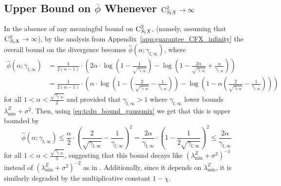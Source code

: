 \documentclass[11pt]{article}
\theoremstyle{definition}
\theoremstyle{plain}
\providecommand{\appendixref}[1]{Appendix~\ref{#1}}
\begin{document}
\subsection{Upper Bound on $\overline{\phi}$ Whenever $\textsc{C}^2_{S_{\mathrm{f}}X} \to \infty$}
In the absence of any meaningful bound on $\textsc{C}^2_{S_{\mathrm{f}}X}$, (namely, assuming that $\textsc{C}^2_{S_{\mathrm{f}}X} \to \infty$), by the analysis from \appendixref{app:guarantee_CFX_infinity} the overall bound on the divergence becomes $\widehat{\phi}(\alpha; \gamma_{\mathrm{f}, \infty})$, where 
\begin{align}
    \widehat{\phi}(\alpha; \gamma_{\mathrm{f}, \infty}) &= \frac{1}{2(\alpha - 1)}\cdot \left(2\alpha \cdot \log\left(1 - \frac{1}{\sqrt{\gamma_{\mathrm{f}, \infty}}}\right) - \log\left(1 - \frac{2\alpha}{\sqrt{\gamma_{\mathrm{f}, \infty}}} + \frac{\alpha}{\gamma_{\mathrm{f}, \infty}}\right)\right)\\
    &= \frac{1}{2(\alpha - 1)}\cdot \left(\alpha \cdot \log\left(1 - \left(\frac{2}{\sqrt{\gamma_{\mathrm{f}, \infty}}} - \frac{1}{\gamma_{\mathrm{f}, \infty}}\right)\right) - \log\left(1 - \alpha \left(\frac{2}{\sqrt{\gamma_{\mathrm{f}, \infty}}} - \frac{1}{\gamma_{\mathrm{f}, \infty}}\right)\right)\right)
\end{align}
for all $1 < \alpha < \frac{\sqrt{\gamma_{\mathrm{f}, \infty}}}{2}$ and provided that $\gamma_{\mathrm{f}, \infty} > 1$ where $\gamma_{\mathrm{f}, \infty}$ lower bounds $\lambda^{Z}_{\min} + \sigma^2$. Then, using \eqref{eq:tcdp_bound_gaussmix} we get that this is upper bounded by 
\begin{equation}
    \widehat{\phi}(\alpha; \gamma_{\mathrm{f}, \infty}) \leq \frac{\alpha}{2}\cdot \left(\frac{2}{\sqrt{\gamma_{\mathrm{f}, \infty}}} - \frac{1}{\gamma_{\mathrm{f}, \infty}}\right)^2 = \frac{2\alpha}{\gamma_{\mathrm{f}, \infty}}\cdot \left(1 - \frac{1}{2\sqrt{\gamma_{\mathrm{f}, \infty}}}\right)^2 \leq \frac{2\alpha}{\gamma_{\mathrm{f}, \infty}}
\end{equation}
for all $1 < \alpha < \frac{\sqrt{\gamma_{\mathrm{f}, \infty}}}{5}$, suggesting that this bound decays like $\left(\lambda^{Z}_{\min} + \sigma^2\right)^{-1}$ instead of $\left(\lambda^{Z}_{\min} + \sigma^2\right)^{-2}$ as in \citet{lev2025gaussianmix}. Additionally, since it depends on $\lambda^{Z}_{\min}$, it is similarly degraded by the multiplicative constant $1-\chi$. 

\vspace{1.0em}
\end{document}
